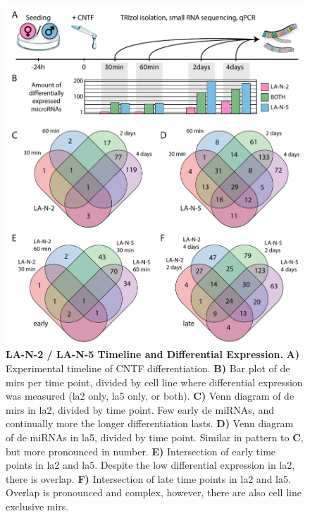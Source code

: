 \begin{figure} 
\includegraphics[width=\textwidth]{figures/timepoints-expr-venn}
\caption[Timeline Differential Expression.]{\textbf{LA-N-2 / LA-N-5 Timeline and Differential Expression.} \textbf{A)} Experimental timeline of CNTF differentiation. \textbf{B)} Bar plot of \acf{de} \acp{mir} per time point, divided by cell line where differential expression was measured (\ac{la2} only, \ac{la5} only, or both). \textbf{C)} Venn diagram of \ac{de} \acp{mir} in \ac{la2}, divided by time point. Few early \ac{de} miRNAs, and continually more the longer differentiation lasts. \textbf{D)} Venn diagram of \ac{de} miRNAs in \ac{la5}, divided by time point. Similar in pattern to \textbf{C}, but more pronounced in number. \textbf{E)} Intersection of early time points in \ac{la2} and \ac{la5}. Despite the low differential expression in \ac{la2}, there is overlap. \textbf{F)} Intersection of late time points in \ac{la2} and \ac{la5}. Overlap is pronounced and complex, however, there are also cell line exclusive \acp{mir}.
\label{fig:timepoints-expr-venn}}
\end{figure}

